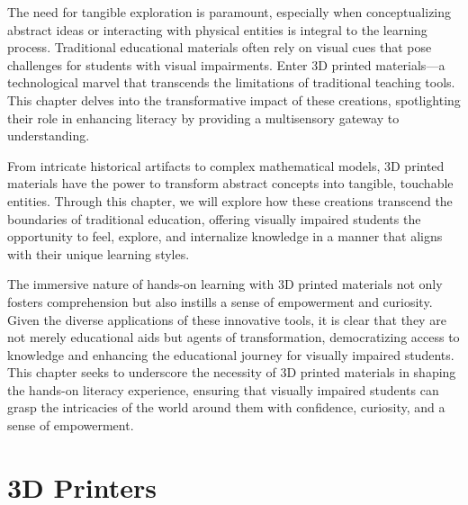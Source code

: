 \documentclass[14pt,letterpaper,twoside]{extreport}
\begin{document}
The need for tangible exploration is paramount, especially when conceptualizing abstract ideas or interacting with physical entities is integral to the learning process. Traditional educational materials often rely on visual cues that pose challenges for students with visual impairments. Enter 3D printed materials—a technological marvel that transcends the limitations of traditional teaching tools. This chapter delves into the transformative impact of these creations, spotlighting their role in enhancing literacy by providing a multisensory gateway to understanding.

From intricate historical artifacts to complex mathematical models, 3D printed materials have the power to transform abstract concepts into tangible, touchable entities. Through this chapter, we will explore how these creations transcend the boundaries of traditional education, offering visually impaired students the opportunity to feel, explore, and internalize knowledge in a manner that aligns with their unique learning styles.

The immersive nature of hands-on learning with 3D printed materials not only fosters comprehension but also instills a sense of empowerment and curiosity. Given the diverse applications of these innovative tools, it is clear that they are not merely educational aids but agents of transformation, democratizing access to knowledge and enhancing the educational journey for visually impaired students. This chapter seeks to underscore the necessity of 3D printed materials in shaping the hands-on literacy experience, ensuring that visually impaired students can grasp the intricacies of the world around them with confidence, curiosity, and a sense of empowerment.


\hypertarget{d-print-equipment}{}	\section{3D Printers}\label{d-print-equipment}
\end{document}
